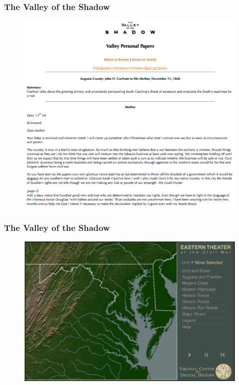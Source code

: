 \documentclass[ignorenonframetext,11pt]{beamer}
\begin{document}
\begin{frame}
\frametitle{The Valley of the Shadow}
\label{thevalleyoftheshadow}

\begin{figure}
	\label{letter}
	\begin{center}
	\includegraphics[keepaspectratio,width=\textwidth, height=.75\textheight]{images/valley.png}
	\end{center}
	\end{figure}
	



\end{frame}
		

\begin{frame}
\frametitle{The Valley of the Shadow}
\label{thevalleyoftheshadow}

\begin{figure}
	\label{map}
	\begin{center}
	\includegraphics[keepaspectratio,width=\textwidth, height=.75\textheight]{images/battlemap.png}
	\end{center}
	\end{figure}
	



\end{frame}
		
\end{document}
